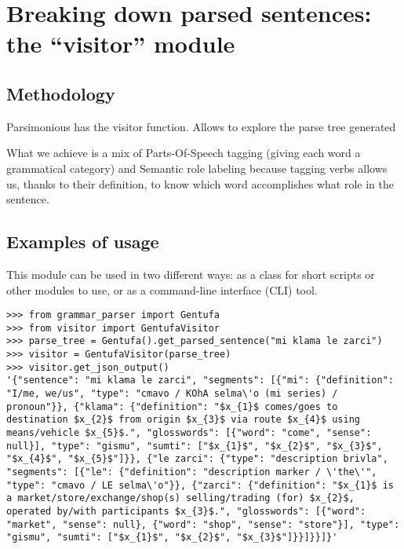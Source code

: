 \chapter{Breaking down parsed sentences: the ``visitor'' module}
\label{chap:visitor-module}

\section{Methodology}

Parsimonious has the visitor function. Allows to explore the parse tree generated

What we achieve is a mix of Parts-Of-Speech tagging (giving each word a grammatical category) and Semantic role labeling
because tagging verbs allows us, thanks to their definition, to know which word accomplishes what role in the sentence.



\newpage

\section{Examples of usage}

This module can be used in two different ways: as a class for short scripts or other modules to use, or as a command-line interface (CLI) tool.

\begin{lstlisting}[caption=GentufaVisitor class being used by a Python script]
>>> from grammar_parser import Gentufa
>>> from visitor import GentufaVisitor
>>> parse_tree = Gentufa().get_parsed_sentence("mi klama le zarci")
>>> visitor = GentufaVisitor(parse_tree)
>>> visitor.get_json_output()
'{"sentence": "mi klama le zarci", "segments": [{"mi": {"definition": "I/me, we/us", "type": "cmavo / KOhA selma\'o (mi series) / pronoun"}}, {"klama": {"definition": "$x_{1}$ comes/goes to destination $x_{2}$ from origin $x_{3}$ via route $x_{4}$ using means/vehicle $x_{5}$.", "glosswords": [{"word": "come", "sense": null}], "type": "gismu", "sumti": ["$x_{1}$", "$x_{2}$", "$x_{3}$", "$x_{4}$", "$x_{5}$"]}}, {"le zarci": {"type": "description brivla", "segments": [{"le": {"definition": "description marker / \'the\'", "type": "cmavo / LE selma\'o"}}, {"zarci": {"definition": "$x_{1}$ is a market/store/exchange/shop(s) selling/trading (for) $x_{2}$, operated by/with participants $x_{3}$.", "glosswords": [{"word": "market", "sense": null}, {"word": "shop", "sense": "store"}], "type": "gismu", "sumti": ["$x_{1}$", "$x_{2}$", "$x_{3}$"]}}]}}]}'
\end{lstlisting}

